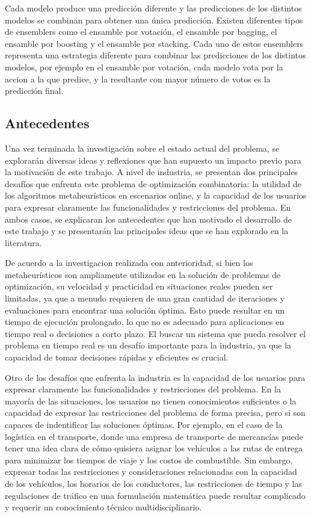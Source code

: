 Cada modelo produce una predicción diferente y las predicciones de los distintos modelos se combinan 
para obtener una única predicción. Existen diferentes tipos de ensemblers como 
el ensamble por votación, el ensamble por bagging, el ensamble por boosting y el ensamble por stacking.
Cada uno de estos ensemblers representa una estrategia diferente para combinar las predicciones de
los distintos modelos, por ejemplo en el ensamble por votación, cada modelo vota por la accion a la que predice, 
y la resultante con mayor número de votos es la predicción final.

\subsection{Antecedentes}
Una vez terminada la investigación sobre el estado actual del problema, se explorarán diversas ideas 
y reflexiones que han supuesto un impacto previo para la motivación de este trabajo. A nivel de industria, se 
presentan dos principales desafíos que enfrenta este problema de optimización combinatoria: la utilidad de los 
algoritmos metaheurísticos en escenarios online, y la capacidad de los usuarios para expresar claramente las 
funcionalidades y restricciones del problema. En ambos casos, se explicaran los antecedentes que han motivado
el desarrollo de este trabajo y se presentarán las principales ideas que se han explorado en la literatura.\medskip

De acuerdo a la investigacion realizada con anterioridad, si bien los metaheurísticos son ampliamente utilizados 
en la solución de problemas de optimización, su velocidad y practicidad en situaciones reales pueden ser limitadas, 
ya que a menudo requieren de una gran cantidad de iteraciones y evaluaciones para encontrar una solución óptima. 
Esto puede resultar en un tiempo de ejecución prolongado, lo que no es adecuado para aplicaciones en tiempo real 
o decisiones a corto plazo. El buscar un sistema que pueda resolver el problema en tiempo real es un desafío 
importante para la industria, ya que la capacidad de tomar decisiones rápidas y eficientes es crucial.\medskip 

Otro de los desafíos que enfrenta la industria es la capacidad de los usuarios para expresar claramente las
funcionalidades y restricciones del problema. En la mayoría de las situaciones, los usuarios no tienen conocimientos
suficientes o la capacidad de expresar las restricciones del problema de forma precisa, pero si son capaces de
indentificar las soluciones óptimas. Por ejemplo, en el caso de la logística en el transporte, donde una empresa 
de transporte de mercancías puede tener una idea clara de cómo quisiera asignar los vehículos a las rutas de 
entrega para minimizar los tiempos de viaje y los costos de combustible. Sin embargo, expresar todas las 
restricciones y consideraciones relacionadas con la capacidad de los vehículos, los horarios de los conductores, 
las restricciones de tiempo y las regulaciones de tráfico en una formulación matemática puede resultar complicado 
y requerir un conocimiento técnico multidisciplinario.\medskip

